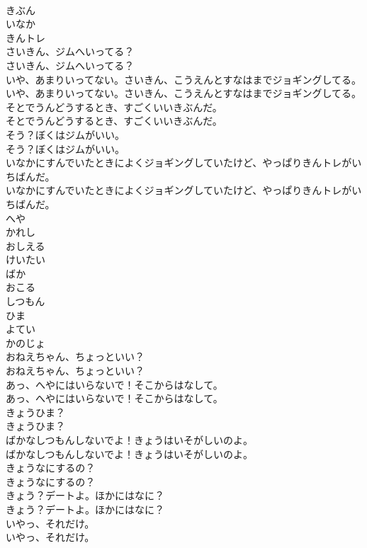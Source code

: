 \documentclass[8pt]{extreport}
\begin{document}
\begin{CJK}{UTF8}{min}
\\	きぶん
\\	いなか
\\	きんトレ
\\	さいきん、ジムへいってる？	
\\	さいきん、ジムへいってる？ 
\\	いや、あまりいってない。さいきん、こうえんとすなはまでジョギングしてる。	
\\	いや、あまりいってない。さいきん、こうえんとすなはまでジョギングしてる。 
\\	そとでうんどうするとき、すごくいいきぶんだ。	
\\	そとでうんどうするとき、すごくいいきぶんだ。 
\\	そう？ぼくはジムがいい。	
\\	そう？ぼくはジムがいい。 
\\	いなかにすんでいたときによくジョギングしていたけど、やっぱりきんトレがいちばんだ。	
\\	いなかにすんでいたときによくジョギングしていたけど、やっぱりきんトレがいちばんだ。 
\\	へや
\\	かれし
\\	おしえる
\\	けいたい
\\	ばか
\\	おこる
\\	しつもん
\\	ひま
\\	よてい
\\	かのじょ
\\	おねえちゃん、ちょっといい？	
\\	おねえちゃん、ちょっといい？ 
\\	あっ、へやにはいらないで！そこからはなして。	
\\	あっ、へやにはいらないで！そこからはなして。 
\\	きょうひま？	
\\	きょうひま？ 
\\	ばかなしつもんしないでよ！きょうはいそがしいのよ。	
\\	ばかなしつもんしないでよ！きょうはいそがしいのよ。 
\\	きょうなにするの？	
\\	きょうなにするの？ 
\\	きょう？デートよ。ほかにはなに？	
\\	きょう？デートよ。ほかにはなに？ 
\\	いやっ、それだけ。	
\\	いやっ、それだけ。 

\end{CJK}
\end{document}
